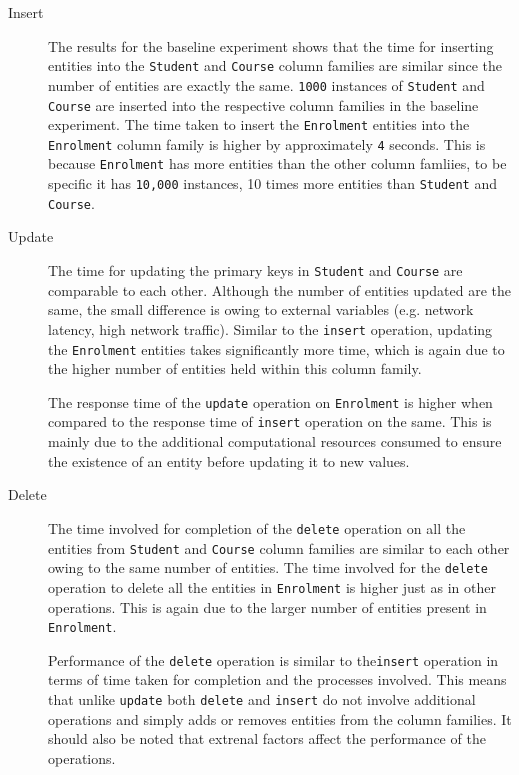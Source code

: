 	\begin{description}
	\item[Insert] The results for the baseline experiment shows that the time for
	inserting entities into the \texttt{Student} and \texttt{Course} column families 
	are similar since the number of entities are exactly the same.
	\texttt{1000} instances of \texttt{Student} and \texttt{Course} are inserted
	into the respective column families in the baseline experiment. The time taken
	to insert the \texttt{Enrolment} entities into the \texttt{Enrolment} column family
	is higher by approximately \texttt{4} seconds. This is because
	\texttt{Enrolment} has more entities than the other column famliies, to be
	specific it has \texttt{10,000} instances, 10 times more entities than
	\texttt{Student} and \texttt{Course}.
	
	\item[Update] The time for updating the primary keys in \texttt{Student} and
	\texttt{Course} are comparable to each other. Although the number of entities
	updated are the same, the small difference is owing to external variables
	(e.g. network latency, high network traffic). Similar to the \texttt{insert}
	operation, updating the \texttt{Enrolment} entities takes significantly more
	time, which is again due to the higher number of entities held within this
	column family. 
	
	The  response time of the \texttt{update} operation on
	\texttt{Enrolment} is higher when compared to the response  time of
	\texttt{insert} operation on the same. This is mainly due to the additional
	computational resources consumed to ensure the existence of an entity before
	updating it to new values.
	
	\item[Delete] The time involved for completion of the \texttt{delete} operation
	on all the entities from \texttt{Student} and \texttt{Course} column families
	are similar to each other owing to the same number of entities. The time
	involved for the \texttt{delete} operation to delete all the entities in
	\texttt{Enrolment} is higher just as in other operations. This is again due to
	the larger number of entities present in \texttt{Enrolment}.
	
	Performance of the \texttt{delete} operation is similar to the\texttt{insert}
	operation in terms of time taken for completion and the processes involved. This
	means that unlike \texttt{update} both \texttt{delete} and \texttt{insert} do
	not involve additional operations and simply adds or removes entities from the
	column families. It should also be noted that extrenal factors affect the
	performance of the operations.
	
	\end{description}

